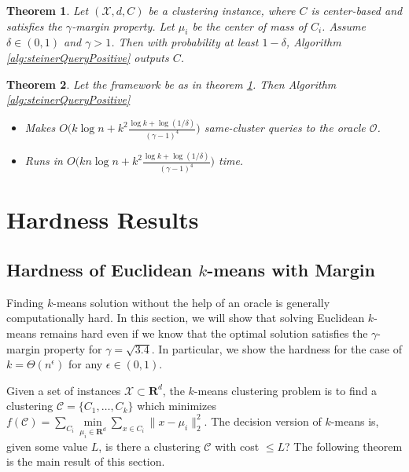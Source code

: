 \documentclass[letterpaper,12pt,titlepage,oneside,final]{book}
\newtheorem{theorem}{Theorem}
\newcommand{\mc}{\mathcal}
\newcommand{\mb}{\mathbf}
\begin{document}
\begin{theorem}
\label{thm:steinerQueryPositive}
Let $(\mc X, d, C)$ be a clustering instance, where $C$ is center-based and satisfies the $\gamma$-margin property. Let $\mu_i$ be the center of mass of $C_i$.
Assume $\delta \in (0, 1)$ and $\gamma > 1$. Then with probability at least $1-\delta$, Algorithm \ref{alg:steinerQueryPositive} outputs $C$.
\end{theorem}

\begin{theorem}
\label{thm:steinerQueryPositiveComplexity}
Let the framework be as in theorem \ref{thm:steinerQueryPositive}. Then Algorithm \ref{alg:steinerQueryPositive} 
\begin{itemize}
\item Makes $O\big(k\log n + k^2\frac{\log k + \log (1/\delta)}{(\gamma - 1)^4}\big)$ same-cluster queries to the oracle $\mc O$.
\item Runs in $O\big(kn\log n + k^2\frac{\log k + \log (1/\delta)}{(\gamma - 1)^4}\big)$ time.
\end{itemize}
\end{theorem}

\section{Hardness Results}
\label{section:lowerBounds}

\subsection{Hardness of Euclidean $k$-means with Margin}

Finding $k$-means solution without the help of an oracle is generally computationally hard. In this section, we will show that solving Euclidean $k$-means remains hard even if we know that the optimal solution satisfies the $\gamma$-margin property for $\gamma=\sqrt{3.4}$. In particular, we show the hardness for the case of $k=\Theta(n^\epsilon)$ for any $\epsilon\in (0,1)$.

Given a set of instances $\mc X \subset \mb R ^d$, the $k$-means clustering problem is to find a clustering $\mc C = \{C_1, \ldots, C_k\}$ which minimizes $f(\mc C) = \sum\limits_{C_i} \min\limits_{\mu_i\in {\mb R}^d}\sum\limits_{x\in C_i} \|x - \mu_i \|_2^2$. The decision version of $k$-means is, given some value $L$, is there a clustering $\mc C$ with cost $\le L$? The following theorem is the main result of this section. 
\end{document}
